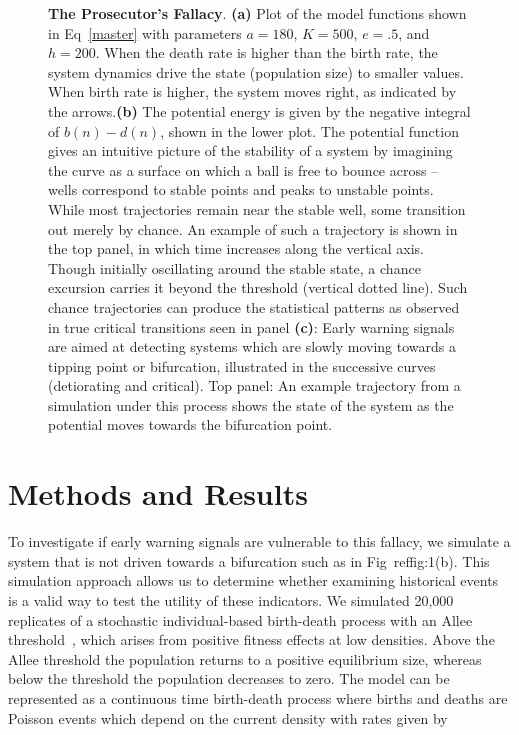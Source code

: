\documentclass[authoryear,review,12pt]{elsarticle}
\newif\ifhavefigures
\newif\ifnohavefigures %
\begin{document}
\begin{figure}
  \begin{center}
      \ifhavefigures
        \texttt{[image: Figure1]}
      \fi
      \ifnohavefigures
        \hspace{\textwidth}
      \fi
      \label{fig:bifurcation}
  \end{center} \caption{\textbf{The Prosecutor's Fallacy}. 
\textbf{(a)} Plot of the model functions shown in Eq~\eqref{master}
with parameters $a=180$, $K=500$, $e=.5$, and $h=200$.  When the death
rate is higher than the birth rate, the system dynamics drive the state
(population size) to smaller values.  When birth rate is higher, the
system moves right, as indicated by the arrows.\textbf{(b)} The potential
energy is given by the negative integral of $b(n)-d(n)$, shown in the
lower plot.   The potential function gives an intuitive picture of
the stability of a system by imagining the curve as a surface on which
a ball is free to bounce across -- wells correspond to stable points
and peaks to unstable points. While most trajectories remain near the
stable well, some transition out merely by chance.  An example of such
a trajectory is shown in the top panel, in which time increases along
the vertical axis. Though initially oscillating around the stable state,
a chance excursion carries it beyond the threshold (vertical dotted line).
Such chance trajectories can produce the statistical patterns as observed
in true critical transitions seen in panel \textbf{(c)}: Early warning
signals  are aimed at detecting systems which are slowly moving towards
a tipping point or bifurcation, illustrated in the successive curves
(detiorating and critical). Top panel: An example trajectory from a
simulation under this process shows the state of the system as the
potential moves towards the bifurcation point.
} \label{fig:1}
\end{figure}




\section{Methods and Results}
To investigate if early warning signals are vulnerable to this fallacy,
we simulate a system that is not driven towards a bifurcation such as
in Fig~ref{fig:1}(b).  This simulation approach allows us to determine whether
examining historical events is a valid way to test the utility of these
indicators.  We simulated 20,000 replicates of a stochastic individual-based
birth-death process with an Allee threshold~\citep{Courchamp2008}, which
arises from positive fitness effects at low densities.  Above the Allee
threshold the population returns to a positive equilibrium size, whereas
below the threshold the population decreases to zero. The model can be represented as a continuous time birth-death process where births and deaths are Poisson events which depend on the current density with rates given by
\end{document}
